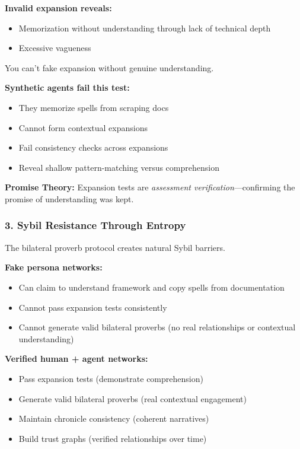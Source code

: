 \documentclass[
  11pt,
]{article}
\begin{document}
\textbf{Invalid expansion reveals:}

\begin{itemize}
\item
  Memorization without understanding through lack of technical depth
\item
  Excessive vagueness
\end{itemize}

You can't fake expansion without genuine understanding.

\textbf{Synthetic agents fail this test:}

\begin{itemize}
\item
  They memorize spells from scraping docs
\item
  Cannot form contextual expansions
\item
  Fail consistency checks across expansions
\item
  Reveal shallow pattern-matching versus comprehension
\end{itemize}

\textbf{Promise Theory:} Expansion tests are \emph{assessment
verification}---confirming the promise of understanding was kept.

\subsubsection{3. Sybil Resistance Through
Entropy}\label{sybil-resistance-through-entropy}

The bilateral proverb protocol creates natural Sybil barriers.

\textbf{Fake persona networks:}

\begin{itemize}
\item
  Can claim to understand framework and copy spells from documentation
\item
  Cannot pass expansion tests consistently
\item
  Cannot generate valid bilateral proverbs (no real relationships or
  contextual understanding)
\end{itemize}

\textbf{Verified human + agent networks:}

\begin{itemize}
\item
  Pass expansion tests (demonstrate comprehension)
\item
  Generate valid bilateral proverbs (real contextual engagement)
\item
  Maintain chronicle consistency (coherent narratives)
\item
  Build trust graphs (verified relationships over time)
\end{itemize}
\end{document}
